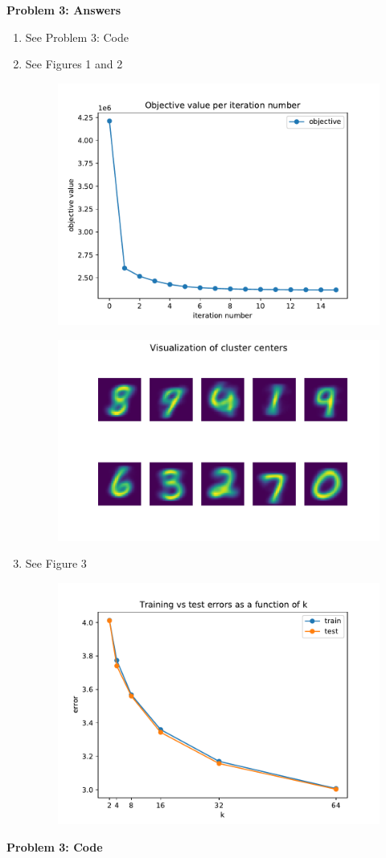{\bf Problem 3: Answers}

\begin{enumerate}
    \item See Problem 3: Code
    \item See Figures 1 and 2
	\begin{figure}[h!]
	    \centering
	    \includegraphics[width=0.8\linewidth]{../figures/a3_plot_b.pdf}
	    \caption{}
	\end{figure}
	\begin{figure}[h!]
	    \centering
	    \includegraphics[width=0.8\linewidth]{../figures/a3_clusters.pdf}
	    \caption{}
	\end{figure}
    \item See Figure 3
	\begin{figure}[h!]
	    \centering
	    \includegraphics[width=0.8\linewidth]{../figures/a3_plot_c.pdf}
	    \caption{}
	\end{figure}
\end{enumerate}

{\bf Problem 3: Code}
\begin{quote}
    
\end{quote}
